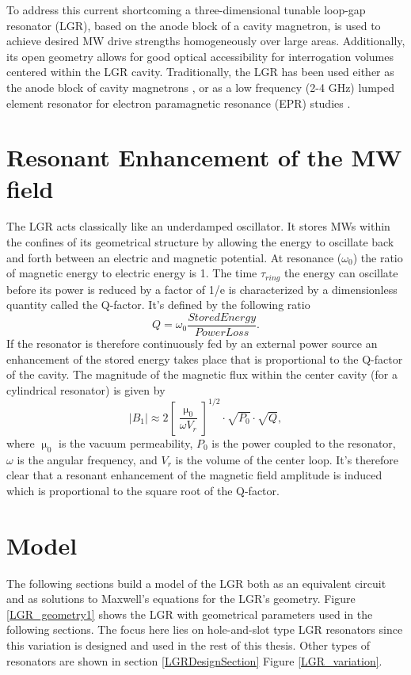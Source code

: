 To address this current shortcoming a three-dimensional tunable loop-gap resonator (LGR), based on the anode block of a cavity magnetron, is used to achieve desired MW drive strengths homogeneously over large areas. Additionally, its open geometry allows for good optical accessibility for interrogation volumes centered within the LGR cavity. Traditionally, the LGR has been used either as the anode block of cavity magnetrons \cite{}, or as a low frequency (2-4 GHz) lumped element resonator for electron paramagnetic resonance (EPR) studies \cite{}.  

\section{Resonant Enhancement of the MW field}\label{resonant_enhc}

The LGR acts classically like an underdamped oscillator. It stores MWs within the confines of its geometrical structure by allowing the energy to oscillate back and forth between an electric and magnetic potential. At resonance ($\omega_0$) the ratio of magnetic energy to electric energy is 1. The time $\tau_{ring}$ the energy can oscillate before its power is reduced by a factor of 1/e is characterized by a dimensionless quantity called the Q-factor. It's defined by the following ratio
\begin{equation}
Q = \omega_0 \frac{Stored Energy}{Power Loss}.
\end{equation}
If the resonator is therefore continuously fed by an external power source an enhancement of the stored energy takes place that is proportional to the Q-factor of the cavity. The magnitude of the magnetic flux within the center cavity (for a cylindrical resonator) is given by
\begin{equation}
|B_1| \approx  2\left[\frac{\upmu_0}{\omega V_r}\right]^{1/2} \cdot \sqrt{P_0} \cdot \sqrt{Q},
\end{equation}
where $\upmu_0$ is the vacuum permeability, $P_0$ is the power coupled to the resonator, $\omega$ is the angular frequency, and $V_r$ is the volume of the center loop. It's therefore clear that a resonant enhancement of the magnetic field amplitude is induced which is proportional to the square root of the Q-factor. 


\section{Model}

The following sections build a model of the LGR both as an equivalent circuit and as solutions to Maxwell's equations for the LGR's geometry. Figure \ref{LGR_geometry1} shows the LGR with geometrical parameters used in the following sections. The focus here lies on hole-and-slot type LGR resonators since this variation is designed and used in the rest of this thesis. Other types of resonators are shown in section \ref{LGRDesignSection} Figure \ref{LGR_variation}.


